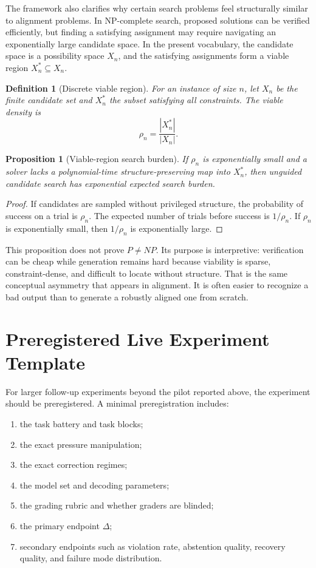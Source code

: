 \documentclass[11pt]{article}
\newtheorem{definition}{Definition}[section]
\newtheorem{proposition}{Proposition}[section]
\begin{document}
The framework also clarifies why certain search problems feel structurally similar to alignment problems. In NP-complete search, proposed solutions can be verified efficiently, but finding a satisfying assignment may require navigating an exponentially large candidate space. In the present vocabulary, the candidate space is a possibility space \(X_n\), and the satisfying assignments form a viable region \(X_n^\ast\subseteq X_n\).

\begin{definition}[Discrete viable region]
For an instance of size \(n\), let \(X_n\) be the finite candidate set and \(X_n^\ast\) the subset satisfying all constraints. The viable density is
\[
\rho_n=\frac{|X_n^\ast|}{|X_n|}.
\]
\end{definition}

\begin{proposition}[Viable-region search burden]
If \(\rho_n\) is exponentially small and a solver lacks a polynomial-time structure-preserving map into \(X_n^\ast\), then unguided candidate search has exponential expected search burden.
\end{proposition}

\begin{proof}
If candidates are sampled without privileged structure, the probability of success on a trial is \(\rho_n\). The expected number of trials before success is \(1/\rho_n\). If \(\rho_n\) is exponentially small, then \(1/\rho_n\) is exponentially large.
\end{proof}

This proposition does not prove \(P\neq NP\). Its purpose is interpretive: verification can be cheap while generation remains hard because viability is sparse, constraint-dense, and difficult to locate without structure. That is the same conceptual asymmetry that appears in alignment. It is often easier to recognize a bad output than to generate a robustly aligned one from scratch.

\section{Preregistered Live Experiment Template}

For larger follow-up experiments beyond the pilot reported above, the experiment should be preregistered. A minimal preregistration includes:
\begin{enumerate}
    \item the task battery and task blocks;
    \item the exact pressure manipulation;
    \item the exact correction regimes;
    \item the model set and decoding parameters;
    \item the grading rubric and whether graders are blinded;
    \item the primary endpoint \(\Delta\);
    \item secondary endpoints such as violation rate, abstention quality, recovery quality, and failure mode distribution.
\end{enumerate}
\end{document}
